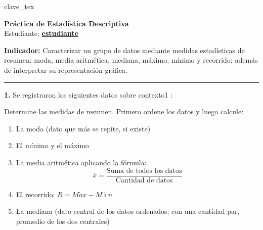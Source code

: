 \documentclass[10pt]{article}
\begin{document}
{{ clave_tex }}          %
{%

\label{inicio_{{ estudiante_id }}}                 %
\begin{center}
    {\Large \textbf{Práctica de Estadística Descriptiva}}\\[0.3em]
    {\normalsize Estudiante: \textbf{\underline{ {{ estudiante }} }} }
\end{center}

\vspace{0.15cm}

\noindent\textbf{Indicador:} Caracterizar un grupo de datos mediante medidas estadísticas de resumen: moda, media aritmética, mediana, máximo, mínimo y recorrido; además de interpretar su representación gráfica.

\vspace{0.1cm}

\noindent{}

\vspace{0.1cm}
\hrule
\vspace{0.15cm}

{%

\textbf{1. } Se registraron los siguientes datos sobre {{ contexto1 }}:

\noindent{}

Determine las medidas de resumen. Primero ordene los datos y luego calcule:
\begin{enumerate}
\item[\small a)] La moda (dato que más se repite, si existe)
\item[\small b)] El mínimo y el máximo
\item[\small c)] La media aritmética aplicando la fórmula:
$$\bar{x} = \frac{\text{Suma de todos los datos}}{\text{Cantidad de datos}}$$
\item[\small d)] El recorrido: $R = M\acute{a}x - M\acute{\imath}n$
\item[\small e)] La mediana (dato central de los datos ordenados; con una cantidad par, promedio de los dos centrales)
\end{enumerate}

}}
\end{document}
